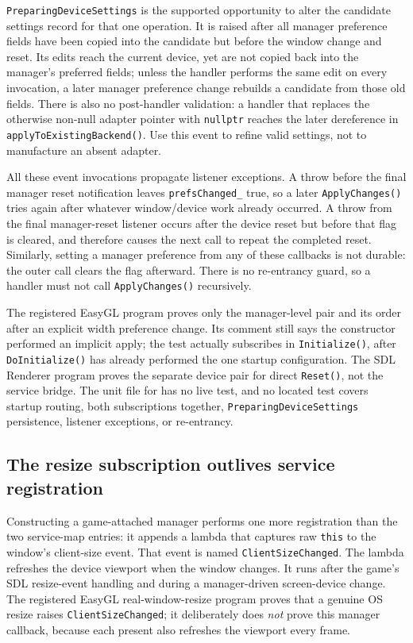 \texttt{PreparingDeviceSettings} is the supported opportunity to alter the candidate settings
record for that one operation. It is raised after all manager preference fields have been copied
into the candidate but before the window change and reset. Its edits reach the current device,
yet are not copied back into the manager's preferred fields; unless the handler performs the
same edit on every invocation, a later manager preference change rebuilds a candidate from those
old fields. There is also no post-handler validation: a handler
that replaces the otherwise non-null adapter pointer with \texttt{nullptr} reaches the later
dereference in \texttt{applyToExistingBackend()}. Use this event to refine valid settings, not
to manufacture an absent adapter.

All these event invocations propagate listener exceptions. A throw before the final manager
reset notification leaves \texttt{prefsChanged\_} true, so a later \texttt{ApplyChanges()} tries
again after whatever window/device work already occurred. A throw from the final manager-reset
listener occurs after the device reset but before that flag is cleared, and therefore causes the
next call to repeat the completed reset. Similarly, setting a manager preference from any of
these callbacks is not durable: the outer call clears the flag afterward. There is no re-entrancy
guard, so a handler must not call \texttt{ApplyChanges()} recursively.

The registered EasyGL program proves only the manager-level pair and its order after an explicit
width preference change. Its comment still says the constructor performed an implicit apply; the
test actually subscribes in \texttt{Initialize()}, after \texttt{DoInitialize()} has already
performed the one startup configuration. The SDL Renderer program proves the separate device
pair for direct \texttt{Reset()}, not the service bridge. The unit file for
 has no live test, and no located test covers startup routing,
both subscriptions together, \texttt{PreparingDeviceSettings} persistence, listener exceptions,
or re-entrancy.

\subsection{The resize subscription outlives service registration}

Constructing a game-attached manager performs one more registration than the two service-map
entries: it appends a lambda that captures raw \texttt{this} to the window's client-size event.
That event is named \texttt{ClientSizeChanged}. The lambda refreshes the device viewport when
the window changes. It runs after the game's SDL resize-event handling and during a
manager-driven screen-device change. The
registered EasyGL real-window-resize program proves that a genuine OS resize raises
\texttt{ClientSizeChanged}; it deliberately does \emph{not} prove this manager callback, because
each present also refreshes the viewport every frame.

